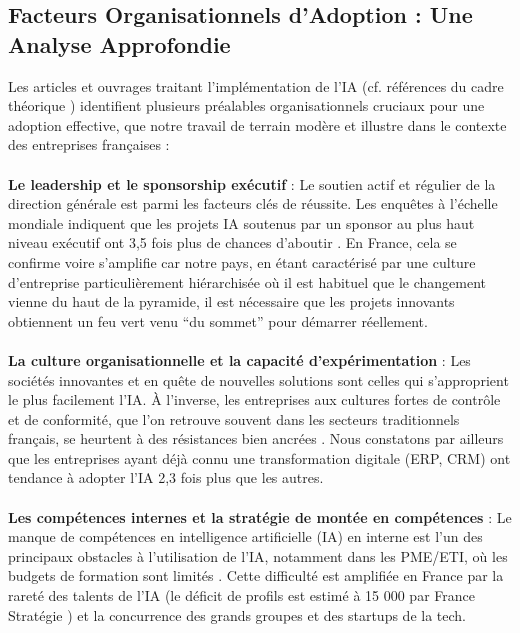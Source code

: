 \subsection{Facteurs Organisationnels d'Adoption : Une Analyse Approfondie}

Les articles et ouvrages traitant l'implémentation de l'IA (cf. références du cadre théorique \cite{davis1989perceived, artimon2025theorie, psicosmart2024resistance, vorecol2024resistance, chen2024airam}) identifient plusieurs préalables organisationnels cruciaux pour une adoption effective, que notre travail de terrain modère et illustre dans le contexte des entreprises françaises :
\\\\
\textbf{Le leadership et le sponsorship exécutif} : Le soutien actif et régulier de la direction générale est parmi les facteurs clés de réussite.  Les enquêtes à l’échelle mondiale indiquent que les projets IA soutenus par un sponsor au plus haut niveau exécutif ont 3,5 fois plus de chances d’aboutir \cite{capgemini2024ai_france}.  En France, cela se confirme voire s’amplifie car notre pays, en étant caractérisé par une culture d’entreprise particulièrement hiérarchisée où il est habituel que le changement vienne du haut de la pyramide, il est nécessaire que les projets innovants obtiennent un feu vert venu “du sommet” pour démarrer réellement.
\\\\
\textbf{La culture organisationnelle et la capacité d'expérimentation} : Les sociétés innovantes et en quête de nouvelles solutions sont celles qui s’approprient le plus facilement l’IA.  
À l’inverse, les entreprises aux cultures fortes de contrôle et de conformité, que l’on retrouve souvent dans les secteurs traditionnels français, se heurtent à des résistances bien ancrées \cite{teece2007dynamic}.  Nous constatons par ailleurs que les entreprises ayant déjà connu une transformation digitale (ERP, CRM) ont tendance à adopter l’IA 2,3 fois plus que les autres.
\\\\
\textbf{Les compétences internes et la stratégie de montée en compétences} : Le manque de compétences en intelligence artificielle (IA) en interne est l'un des principaux obstacles à l'utilisation de l'IA, notamment dans les PME/ETI, où les budgets de formation sont limités \cite{bpifrance2025ia}.  Cette difficulté est amplifiée en France par la rareté des talents de l'IA (le déficit de profils est estimé à 15 000 par France Stratégie \cite{france_strategie2025make}) et la concurrence des grands groupes et des startups de la tech.
